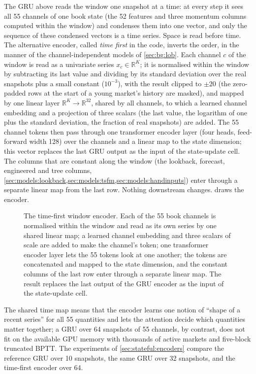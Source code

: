 The GRU above reads the window one snapshot at a time: at every step it sees all 55
channels of one book state (the 52 features and three momentum columns computed
within the window) and condenses them into one vector, and only the sequence of these
condensed vectors is a time series.  Space is read before time.  The alternative
encoder, called \emph{time first} in the code, inverts the order, in the manner of the
channel-independent models of \cref{sec:bg:lob}.  Each channel $c$ of the window is
read as a univariate series $x_c \in \mathbb{R}^K$; it is normalised within the window
by subtracting its last value and dividing by its standard deviation over the real
snapshots plus a small constant ($10^{-3}$), with the result clipped to $\pm 20$ (the
zero-padded rows at the start of a young market's history are masked), and mapped by one
linear layer $\mathbb{R}^K \to \mathbb{R}^{32}$, shared by all channels, to which a learned
channel embedding and a projection of three scalars (the last value, the logarithm of one
plus the standard deviation, the fraction of real snapshots) are added.  The
55 channel tokens then pass through one transformer encoder layer (four heads, feed-forward
width 128) over the channels and a linear map to the state dimension; this vector replaces the last GRU
output as the input of the state-update cell.  The columns that are constant along the
window (the lookback, forecast, engineered and tree columns,
\cref{sec:models:lookback,sec:models:tsfm,sec:models:handinputs}) enter through a separate
linear map from the last row.  Nothing downstream changes.
 draws the encoder.

\begin{figure}[t]
\centering
\resizebox{0.92\textwidth}{!}{}
\caption{The time-first window encoder.  Each of the 55 book channels is normalised
within the window and read as its own series by one shared linear map; a learned
channel embedding and three scalars of scale are added to make the channel's token; one
transformer encoder layer lets the 55 tokens look at one another; the tokens are
concatenated and mapped to the state dimension, and the constant columns of the last row
enter through a separate linear map.  The result replaces the last output of the GRU
encoder as the input of the state-update cell.}
\label{fig:models:timefirst}
\end{figure}

The shared time map means that the encoder learns one notion of ``shape of a recent
series'' for all 55 quantities and lets the attention decide which quantities matter
together; a GRU over 64 snapshots of 55 channels, by contrast, does not fit on the
available GPU memory with thousands of active markets and five-block truncated BPTT.
The experiments of \cref{sec:stateful:encoders} compare the reference GRU over 10
snapshots, the same GRU over 32 snapshots, and the time-first encoder over 64.

